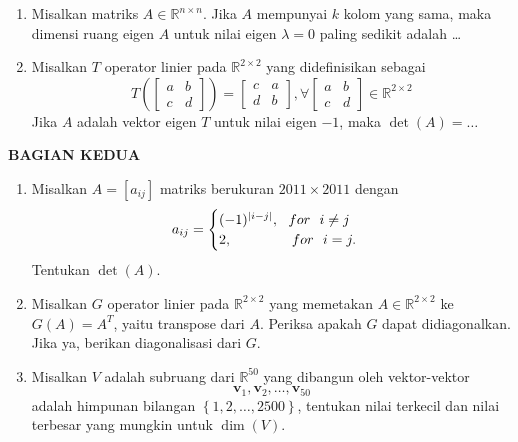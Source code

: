 \documentclass[12pt,twoside]{article}
\begin{document}
\begin{enumerate}
	\item Misalkan matriks $A \in \mathbb{R}^{n \times n}$. Jika $A$ mempunyai $k$ kolom yang sama, maka dimensi ruang eigen $A$ untuk nilai eigen $\lambda = 0$ paling sedikit adalah \dots

	\item Misalkan $T$ operator linier pada $\mathbb{R}^{2 \times 2}$ yang didefinisikan sebagai
	      \begin{equation*}
		      T \left( \left[ \begin{array}{cc}
				      a & b \\c&d
			      \end{array} \right] \right) = \left[ \begin{array}{cc}
				      c & a \\d&b
			      \end{array} \right], \forall \left[ \begin{array}{cc}
				      a & b \\c&d
			      \end{array} \right] \in \mathbb{R}^{2 \times 2}
	      \end{equation*}
	      Jika $A$ adalah vektor eigen $T$ untuk nilai eigen $-1$, maka $\det(A) = \dots$
\end{enumerate}

\newpage \textbf{BAGIAN KEDUA}
\begin{enumerate}
	\item Misalkan $A = [a_{ij}]$ matriks berukuran $2011 \times 2011$ dengan
	      \begin{equation*}
		      a_{ij} = \begin{cases}
			      (-1)^{|i-j|}, ~~ for	~~ i \neq j \\
			      2, 	\hspace{1.5cm}			 for 	~~ i = j.
		      \end{cases}
	      \end{equation*}
	      Tentukan $\det(A).$

	\item Misalkan $G$ operator linier pada $\mathbb{R}^{2 \times 2}$ yang memetakan $A \in \mathbb{R}^{2 \times 2}$ ke $G(A) = A^T$, yaitu transpose dari $A$. Periksa apakah $G$ dapat didiagonalkan. Jika ya, berikan diagonalisasi dari $G$.

	\item Misalkan $V$ adalah subruang dari $\mathbb{R}^{50}$ yang dibangun oleh vektor-vektor $$\textbf{v}_1, \textbf{v}_2,\dots,\textbf{v}_{50}$$ adalah himpunan bilangan $\left\lbrace 1,2,\dots, 2500 \right\rbrace$, tentukan nilai terkecil dan nilai terbesar yang mungkin untuk $\dim(V)$.
\end{enumerate}
\end{document}

